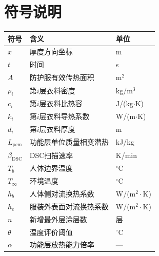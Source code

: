 \section{符号说明}

\begin{table}[H]
    \centering
    \begingroup
    \setlength{\extrarowheight}{1pt}
    \begin{tabularx}{0.92\textwidth}{
        >{\centering\arraybackslash}p{2.5cm}
        >{\centering\arraybackslash}X
        >{\centering\arraybackslash}p{2.3cm}}
        \toprule
        \rowcolor{cyan!50!blue!30}
        \textbf{符号} & \textbf{含义} & \textbf{单位} \\
        \midrule
        $x$ & 厚度方向坐标 & m \\
        $t$ & 时间 & s \\
        $A$ & 防护服有效传热面积 & m$^2$ \\
        $\rho_i$ & 第$i$层衣料密度 & kg/m$^3$ \\
        $c_i$ & 第$i$层衣料比热容 & J/(kg$\cdot$K) \\
        $k_i$ & 第$i$层衣料导热系数 & W/(m$\cdot$K) \\
        $d_i$ & 第$i$层衣料厚度 & m \\
        $L_{\mathrm{pcm}}$ & 功能层单位质量相变潜热 & kJ/kg \\
        $\beta_{\mathrm{DSC}}$ & DSC扫描速率 & K/min \\
        $T_b$ & 人体边界温度 & $^\circ$C \\
        $T_\infty$ & 环境温度 & $^\circ$C \\
        $h_b$ & 人体侧对流换热系数 & W/(m$^2\cdot$K) \\
        $h_e$ & 服装外表面对流换热系数 & W/(m$^2\cdot$K) \\
        $n$ & 新增最外层涂层数 & 层 \\
        $\theta$ & 温度评价阈值 & $^\circ$C \\
        $\alpha$ & 功能层放热能力倍率 & --- \\
        \bottomrule
    \end{tabularx}
    \endgroup
\end{table}
\FloatBarrier